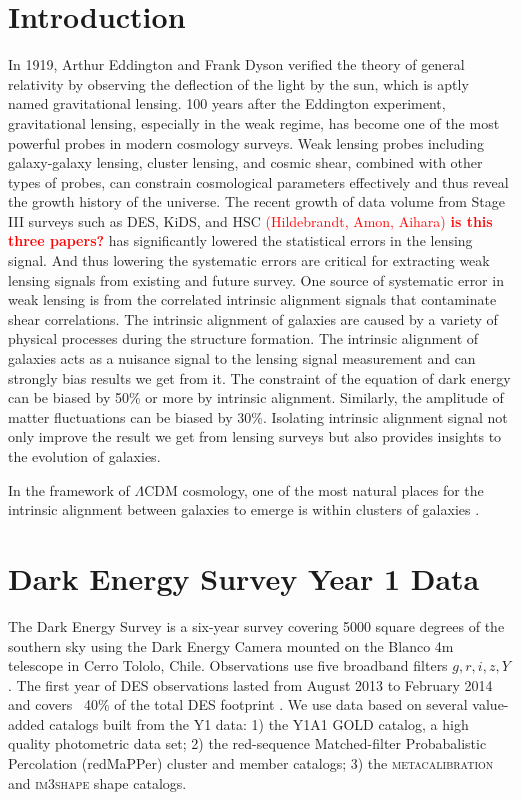 \documentclass[fleqn,usenatbib]{mnras}
\newcommand{\verify}[1]{\textcolor{red}{\textbf{{#1}}}}
\newcommand\ct[1]{\textcolor{red}{(#1)}}
\begin{document}
\section{Introduction}
In 1919, Arthur Eddington and Frank Dyson verified the theory of general relativity by observing the deflection of the light by the sun, which is aptly named gravitational lensing. 100 years after the Eddington experiment, gravitational lensing, especially in the weak regime, has become one of the most powerful probes in modern cosmology surveys. Weak lensing probes including galaxy-galaxy lensing, cluster lensing, and cosmic shear, combined with other types of probes, can constrain cosmological parameters effectively and thus reveal the growth history of the universe. The recent growth of data volume from Stage III surveys such as DES, KiDS, and HSC \ct{Hildebrandt, Amon, Aihara} \verify{is this three papers?} has significantly lowered the statistical errors in the lensing signal. And thus lowering the systematic errors are critical for extracting weak lensing signals from existing and future survey. One source of systematic error in weak lensing is from the correlated intrinsic alignment signals that contaminate shear correlations. The intrinsic alignment of galaxies are caused by a variety of physical processes during the structure formation. The intrinsic alignment of galaxies acts as a nuisance signal to the lensing signal measurement and can strongly bias results we get from it. The constraint of the equation of dark energy can be biased by 50\% or more by intrinsic alignment. Similarly, the amplitude of matter fluctuations can be biased by 30\%. Isolating intrinsic alignment signal not only improve the result we get from lensing surveys but also provides insights to the evolution of galaxies.\cite{troxeliareview}

In the framework of $\Lambda$CDM cosmology, one of the most natural places for the intrinsic alignment between galaxies to emerge is within clusters of galaxies \cite{whiterees}. 




\section{Dark Energy Survey Year 1 Data}
The Dark Energy Survey is a six-year survey covering 5000 square degrees of the southern sky using the Dark Energy Camera \cite{decam} mounted on the Blanco 4m telescope in Cerro Tololo, Chile. Observations use five broadband filters $g, r, i, z , Y$. The first year of DES observations lasted from August 2013 to February 2014 and covers ~40\% of the total DES footprint \cite{y1gold}. We use data based on several value-added catalogs built from the Y1 data: 1) the Y1A1 GOLD catalog, a high quality photometric data set; 2) the red-sequence Matched-filter Probabalistic Percolation (redMaPPer) cluster and member catalogs; 3) the \textsc{metacalibration} and \textsc{im3shape} shape catalogs. 
\end{document}

